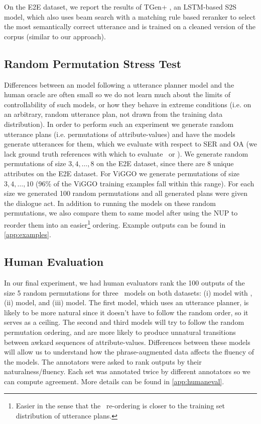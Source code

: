 On the E2E dataset, we report the results of 
TGen+ \cite{dusek2019}, an
LSTM-based S2S model, which also uses beam search with a matching rule based
reranker to select the most semantically correct utterance and is
trained on a cleaned version of the corpus (similar to our approach).
   
\subsection{Random Permutation Stress Test}



Differences between an  model following a utterance planner model
and the human oracle are often small so we do not learn much about the limits
of controllability of such models, or how they behave in extreme conditions
(i.e. on an arbitrary, random utterance plan, not drawn from the training data
distribution). In order to perform such an experiment we generate random
utterance plans (i.e. permutations of attribute-values) and have the
 models generate utterances for them, which we evaluate with
respect to SER and OA (we lack ground truth references with which to evaluate
\bleu~or \rougel).  We generate random permutations of size $3,4,\ldots, 8$ on
the E2E dataset, since there are 8 unique attributes on the E2E dataset. For
ViGGO we generate permutations of size $3,4,\ldots,10$ (96\% of the ViGGO
training examples fall within this range). For each size we generated 100
random permutations and all generated plans were given the 
dialogue act. In addition to running the  models on these random
permutations, we also compare them to same model after using the NUP  to
reorder them into an easier\footnote{Easier in the sense that the
\NUP~re-ordering is closer to the training set distribution of 
utterance plans.} ordering.  Example outputs can be
found in \autoref{app:examples}.  



\subsection{Human Evaluation} In our final experiment, we had human evaluators
rank the 100 outputs of the size 5 random permutations for three \BART~models
on both datasets: (i)  model with \NUP,  (ii) 
model, and (iii)  model.  The first model, which uses an utterance
planner, is likely to be more natural since it doesn't have to follow the
random order, so it serves as a ceiling.  The second and third models will try
to follow the random permutation ordering, and are more likely to produce
unnatural transitions between awkard sequences of attribute-values.
Differences between these models will allow us to understand how the
phrase-augmented data affects the fluency of the models.  The annotators were
asked to rank outputs by their naturalness/fluency.  Each set was annotated
twice by different annotators so we can compute agreement. More details can be
found in \autoref{app:humaneval}.



